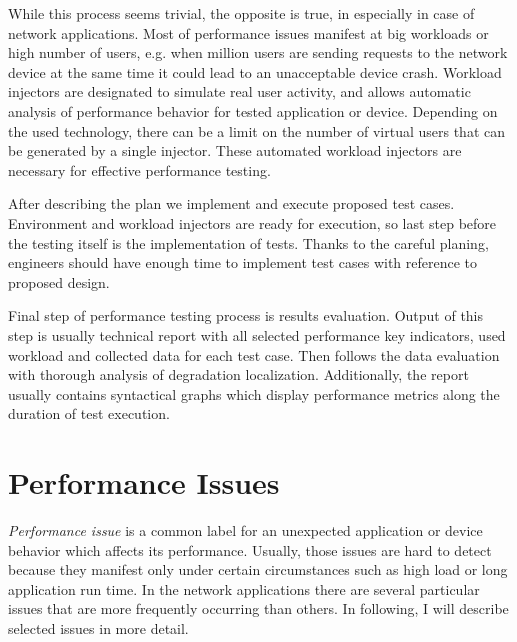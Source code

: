 While this process seems trivial, the opposite is true, in especially in case of network applications. Most of performance issues manifest at big workloads or high number of users, e.g. when million users are sending requests to the network device at the same time it could lead to an unacceptable device crash. Workload injectors are designated to simulate real user activity, and allows automatic analysis of performance behavior for tested application or device. Depending on the used technology, there can be a limit on the number of virtual users that can be generated by a single injector. These automated workload injectors are necessary for effective performance testing.

After describing the plan we implement and execute proposed test cases. Environment and workload injectors are ready for execution, so last step before the testing itself is the implementation of tests. Thanks to the careful planing, engineers should have enough time to implement test cases with reference to proposed design. 

Final step of performance testing process is results evaluation. Output of this step is usually technical report with all selected performance key indicators, used workload and collected data for each test case. Then follows the data evaluation with thorough analysis of degradation localization. Additionally, the report usually contains syntactical graphs which display performance metrics along the duration of test execution.

\section{Performance Issues}
\label{Performance Issues}
\emph{Performance issue} is a common label for an unexpected application or device behavior which affects its performance. Usually, those issues are hard to detect because they manifest only under certain circumstances such as high load or long application run time. In the network applications there are several particular issues that are more frequently occurring  than others. In following, I will describe selected issues in more detail.

